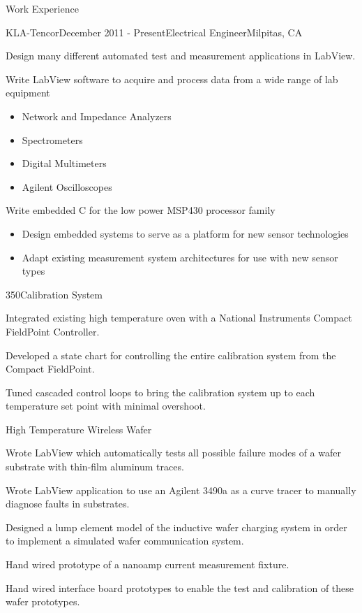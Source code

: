 \documentclass{resume} %
\begin{document}
\begin{rSection}{Work Experience}

\begin{rSubsection}{KLA-Tencor}{December 2011 - Present}{Electrical Engineer}{Milpitas, CA}
\smallskip
\item Design many different automated test and measurement applications in LabView.
\item Write LabView software to acquire and process data from a wide range of lab equipment
\begin{itemize}
\itemsep -0.5em \vspace{-0.5em}
\renewcommand{\labelitemi}{-}
\item Network and Impedance Analyzers
\item Spectrometers
\item Digital Multimeters
\item Agilent Oscilloscopes 
\end{itemize}
\item Write embedded C for the low power MSP430 processor family
\begin{itemize}
\itemsep -0.5em \vspace{-0.5em}
\renewcommand{\labelitemi}{-}
\item Design embedded systems to serve as a platform for new sensor technologies
\item Adapt existing measurement system architectures for use with new sensor types
\end{itemize}

\begin{rWorkProject}{350\celsius \space Calibration System}
\item Integrated existing high temperature oven with a National Instruments Compact FieldPoint Controller.
\item Developed a state chart for controlling the entire calibration system from the Compact FieldPoint.
\item Tuned cascaded control loops to bring the calibration system up to each temperature set point with minimal overshoot.
\end{rWorkProject}

\begin{rWorkProject}{High Temperature Wireless Wafer}
\item Wrote LabView which automatically tests all possible failure modes of a wafer substrate with thin-film aluminum traces.
\item Wrote LabView application to use an Agilent 3490a as a curve tracer to manually diagnose faults in substrates.
\item Designed a lump element model of the inductive wafer charging system in order to implement a simulated wafer communication system.
\item Hand wired prototype of a nanoamp current measurement fixture.
\item Hand wired interface board prototypes to enable the test and calibration of these wafer prototypes.
\end{rWorkProject}


\end{rSubsection}
\end{rSection}
\end{document}
